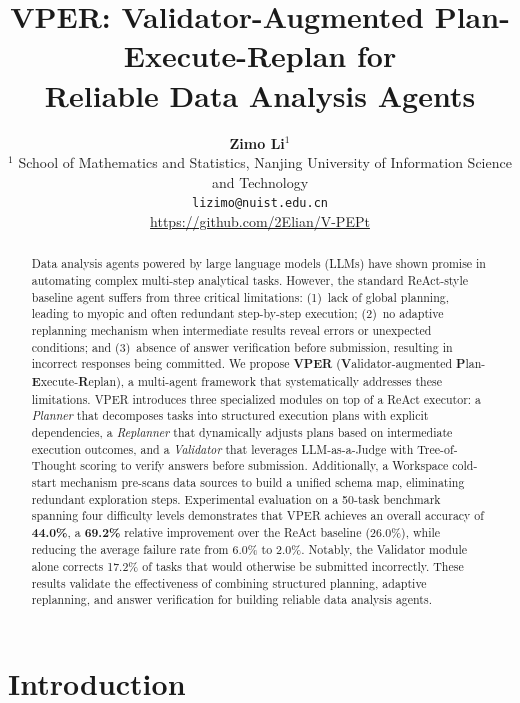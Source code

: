 \documentclass{article}
\title{VPER: Validator-Augmented Plan-Execute-Replan for\\Reliable Data Analysis Agents}
\author{
  \textbf{Zimo Li}$^{1}$\footnotemark[1] \\
  $^1$ School of Mathematics and Statistics, Nanjing University of Information Science and Technology \\
  \texttt{lizimo@nuist.edu.cn} \\
  \textcolor{red}{\url{https://github.com/2Elian/V-PEPt}}
}
\begin{document}
\renewcommand{\thefootnote}{\fnsymbol{footnote}}
\maketitle

\begin{abstract}
Data analysis agents powered by large language models (LLMs) have shown promise in automating complex multi-step analytical tasks.
However, the standard ReAct-style baseline agent suffers from three critical limitations: (1)~lack of global planning, leading to myopic and often redundant step-by-step execution; (2)~no adaptive replanning mechanism when intermediate results reveal errors or unexpected conditions; and (3)~absence of answer verification before submission, resulting in incorrect responses being committed.
We propose \textbf{VPER} (\textbf{V}alidator-augmented \textbf{P}lan-\textbf{E}xecute-\textbf{R}eplan), a multi-agent framework that systematically addresses these limitations.
VPER introduces three specialized modules on top of a ReAct executor: a \emph{Planner} that decomposes tasks into structured execution plans with explicit dependencies, a \emph{Replanner} that dynamically adjusts plans based on intermediate execution outcomes, and a \emph{Validator} that leverages LLM-as-a-Judge with Tree-of-Thought scoring to verify answers before submission.
Additionally, a Workspace cold-start mechanism pre-scans data sources to build a unified schema map, eliminating redundant exploration steps.
Experimental evaluation on a 50-task benchmark spanning four difficulty levels demonstrates that VPER achieves an overall accuracy of \textbf{44.0\%}, a \textbf{69.2\%} relative improvement over the ReAct baseline (26.0\%), while reducing the average failure rate from 6.0\% to 2.0\%.
Notably, the Validator module alone corrects 17.2\% of tasks that would otherwise be submitted incorrectly.
These results validate the effectiveness of combining structured planning, adaptive replanning, and answer verification for building reliable data analysis agents.
\end{abstract}


\section{Introduction}
\end{document}
